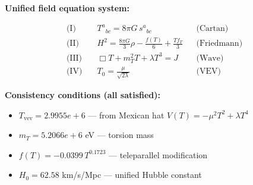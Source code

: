 
\textbf{Unified field equation system:}

\begin{align}
  \text{(I)} \quad & T^a{}_{bc} = 8\pi G \, s^a{}_{bc} && \text{(Cartan)} \\
  \text{(II)} \quad & H^2 = \frac{8\pi G}{3}\rho - \frac{f(T)}{6} + \frac{Tf_T}{3} && \text{(Friedmann)} \\
  \text{(III)} \quad & \Box T + m_T^2 T + \lambda T^3 = J && \text{(Wave)} \\
  \text{(IV)} \quad & T_0 = \frac{\mu}{\sqrt{2\lambda}} && \text{(VEV)}
\end{align}

\textbf{Consistency conditions (all satisfied):}
\begin{itemize}
  \item $T_{\text{vev}} = 2.9955e+6$ — from Mexican hat $V(T) = -\mu^2 T^2 + \lambda T^4$
  \item $m_T = 5.2066e+6$ eV — torsion mass
  \item $f(T) = -0.0399 \, T^{0.1723}$ — teleparallel modification
  \item $H_0 = 62.58$ km/s/Mpc — unified Hubble constant
\end{itemize}